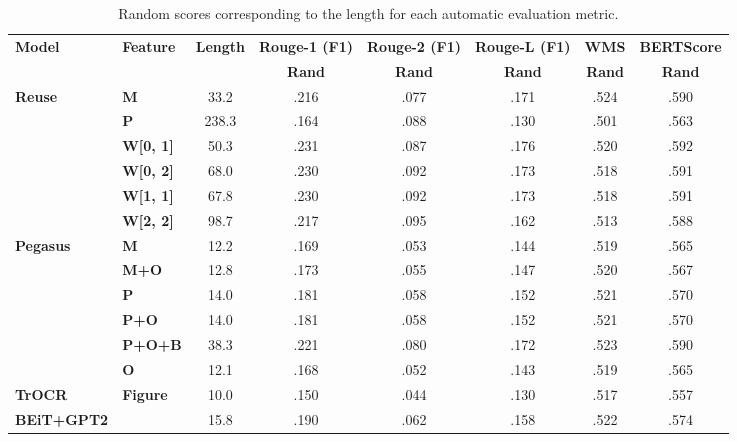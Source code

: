 \begin{table}[t]
\centering \small
\begin{tabular}{@{}llcccccc@{}}
\toprule
\multirow{2}{*}{\textbf{Model}} & \multirow{2}{*}{\textbf{Feature}} & \multirow{2}{*}{\textbf{Length}} & \textbf{Rouge-1 (F1)} & \textbf{Rouge-2 (F1)} & \textbf{Rouge-L (F1)} & \textbf{WMS} & \textbf{BERTScore} \\ \cmidrule{4-8}
 &  &  & \textbf{Rand} & \textbf{Rand} & \textbf{Rand} & \textbf{Rand} & \textbf{Rand} \\ \midrule
\multirow{6}{*}{\textbf{Reuse}} & \textbf{M} & 33.2 & .216 & .077 & .171 & .524 & .590 \\
 & \textbf{P} & 238.3 & .164 & .088 & .130 & .501 & .563 \\
 & \textbf{W{[}0, 1{]}} & 50.3 & .231 & .087 & .176 & .520 & .592 \\
 & \textbf{W{[}0, 2{]}} & 68.0 & .230 & .092 & .173 & .518 & .591 \\
 & \textbf{W{[}1, 1{]}} & 67.8 & .230 & .092 & .173 & .518 & .591 \\
 & \textbf{W{[}2, 2{]}} & 98.7 & .217 & .095 & .162 & .513 & .588 \\ \midrule
\multirow{6}{*}{\textbf{Pegasus}} & \textbf{M} & 12.2 & .169 & .053 & .144 & .519 & .565 \\
 & \textbf{M+O} & 12.8 & .173 & .055 & .147 & .520 & .567 \\
 & \textbf{P} & 14.0 & .181 & .058 & .152 & .521 & .570 \\
 & \textbf{P+O} & 14.0 & .181 & .058 & .152 & .521 & .570 \\
 & \textbf{P+O+B} & 38.3 & .221 & .080 & .172 & .523 & .590 \\
 & \textbf{O} & 12.1 & .168 & .052 & .143 & .519 & .565 \\ \midrule
\textbf{TrOCR} & \multirow{2}{*}{\textbf{Figure}} & 10.0 & .150 & .044 & .130 & .517 & .557 \\
\textbf{BEiT+GPT2} &  & 15.8 & .190 & .062 & .158 & .522 & .574 \\
\bottomrule
\end{tabular}
\caption{Random scores corresponding to the length for each automatic evaluation metric.}
\label{tab:random-scores}
\end{table}